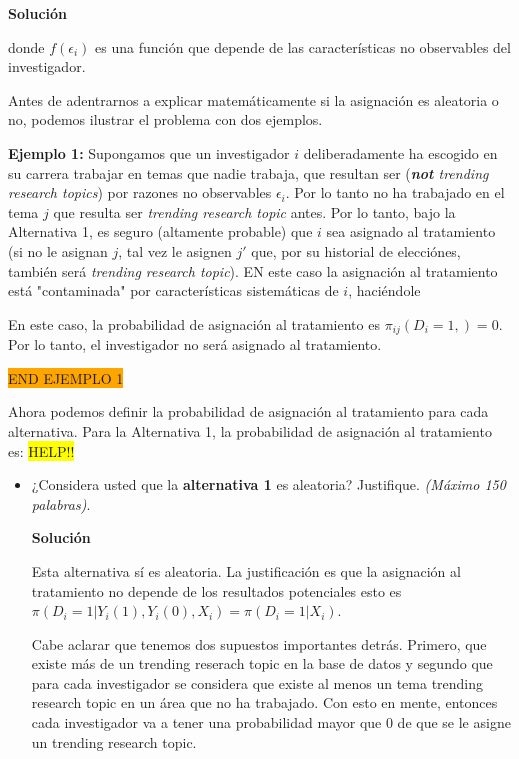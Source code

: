 \documentclass[a4paper, answers, addpoints, 11pt]{exam}
\newenvironment{solucion}{%
  \begin{mdframed}[
    backgroundcolor=blue!5,    %
    linecolor=blue!50,          %
    linewidth=2pt,              %
    leftmargin=10pt,            %
    rightmargin=10pt,           %
    topline=true,              %
    bottomline=true,            %
    roundcorner=10pt,           %
    innerleftmargin=10pt,       %
    innerrightmargin=10pt,      %
    innerbottommargin=10pt,     %
    innertopmargin=10pt         %
  ]%
  \begin{tcolorbox}[colframe=blue!50!black, colback=blue!50, coltitle=white, sharp corners=all, boxrule=1mm, width=\textwidth, halign=left, valign=center, top=0mm, bottom=0mm, left=0mm, right=0mm] \textbf{Solución} \end{tcolorbox} }{\end{mdframed}}
\begin{document}
\begin{itemize}
\begin{solucion}
donde $f(\epsilon_i)$ es una función que depende de las características no observables del investigador.

Antes de adentrarnos a explicar matemáticamente si la asignación es aleatoria o no, podemos ilustrar el problema con dos ejemplos.

\textbf{Ejemplo 1:} Supongamos que un investigador $i$ deliberadamente ha escogido en su carrera trabajar en temas que nadie trabaja, que resultan ser (\textit{\textbf{not} trending research topics}) por razones no observables $\epsilon_i$. Por lo tanto no ha trabajado en el tema $j$ que resulta ser \textit{trending research topic} antes. Por lo tanto, bajo la Alternativa 1, es seguro (altamente probable) que $i$ sea asignado al tratamiento (si no le asignan $j$, tal vez le asignen $j'$ que, por su historial de elecciónes, también será \textit{trending research topic}). EN este caso la asignación al tratamiento está "contaminada" por características sistemáticas de $i$, haciéndole 

En este caso, la probabilidad de asignación al tratamiento es $\pi_{ij}(D_i = 1, ) = 0$. Por lo tanto, el investigador no será asignado al tratamiento.

\colorbox{orange}{END EJEMPLO 1}

Ahora podemos definir la probabilidad de asignación al tratamiento para cada alternativa. Para la Alternativa 1, la probabilidad de asignación al tratamiento es:
\colorbox{yellow}{HELP!!}

 
    \end{solucion}
    
    \begin{itemize}
        \item ¿Considera usted que la \textbf{alternativa 1} es aleatoria? Justifique. \textit{(Máximo 150 palabras)}.
         \begin{solucion}
             
      Esta alternativa sí es aleatoria. La justificación es que la asignación al tratamiento no depende de los resultados potenciales esto es $\pi(D_i = 1 | Y_i(1), Y_i(0), X_i) = \pi(D_i = 1 | X_i)$. 
      
      Cabe aclarar que tenemos dos supuestos importantes detrás. Primero, que existe más de un trending reserach topic en la base de datos y segundo que para cada investigador se considera que existe al menos un tema trending research topic en un área que no ha trabajado. Con esto en mente, entonces cada investigador va a tener una probabilidad mayor que 0 de que se le asigne un trending research topic.
      

\end{solucion}
\end{itemize}
\end{itemize}
\end{document}
